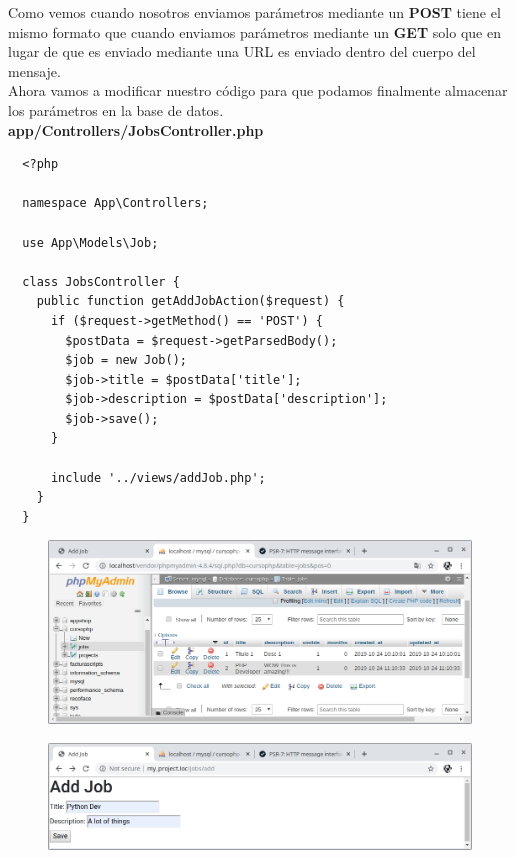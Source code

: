 \documentclass{article}
\begin{document}
Como vemos cuando nosotros enviamos parámetros mediante un \textbf{POST} tiene
el mismo formato que cuando enviamos parámetros mediante un \textbf{GET} solo
que en lugar de que es enviado mediante una URL es enviado dentro del cuerpo
del mensaje.\\

Ahora vamos a modificar nuestro código para que podamos finalmente almacenar
los parámetros en la base de datos.\\

\textbf{app/Controllers/JobsController.php}
\begin{verbatim}
  <?php

  namespace App\Controllers;

  use App\Models\Job;

  class JobsController {
    public function getAddJobAction($request) {
      if ($request->getMethod() == 'POST') {
        $postData = $request->getParsedBody();
        $job = new Job();
        $job->title = $postData['title'];
        $job->description = $postData['description'];
        $job->save();
      }

      include '../views/addJob.php';
    }
  }
\end{verbatim}

\begin{figure}[h!]
  \centering
  \includegraphics[scale=0.5]{./Pictures/145_bd_jobs_actual.png}
\end{figure}

\begin{figure}[h!]
  \centering
  \includegraphics[scale=0.5]{./Pictures/146_datos_guardar_jobs.png}
\end{figure}
\end{document}
